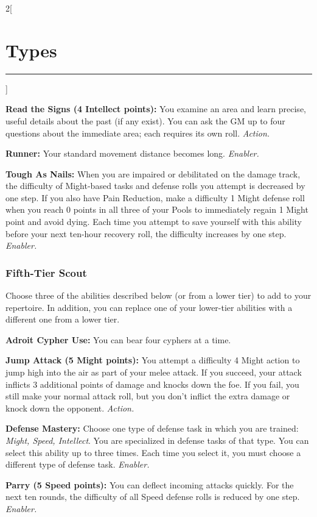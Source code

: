 \documentclass[a4paper,10pt,final]{book}
\newcommand{\HRule}{\rule{\linewidth}{0.5mm}} %
\newcommand{\newSection}[1]{\section*{#1} \addcontentsline{toc}{section}{#1} \label{sec:#1} \HRule}
\newcommand{\itemAbility}[2]{\textcolor{25gray}{\textbullet\textbf{ #1:}} {#2}\par}
\newcommand{\enabler}{\textit{ Enabler.}}
\newcommand{\action}{\textit{ Action.}}
\newenvironment{docsection}[1]
{
  \begin{multicols*}{2}[\newSection{#1}]
}
{
  \end{multicols*}
  \newpage
}
\begin{document}
\begin{docsection}{Types}
\itemAbility{Read the Signs (4 Intellect points)}{You examine an area and learn precise, useful details about the past (if any exist). You can ask the GM up to four questions about the immediate area; each requires its own roll.\action}

\itemAbility{Runner}{Your standard movement distance becomes long.\enabler}

\itemAbility{Tough As Nails}{When you are impaired or debilitated on the damage track, the difficulty of Might-based tasks and defense rolls you attempt is decreased by one step. If you also have Pain Reduction, make a difficulty 1 Might defense roll when you reach 0 points in all three of your Pools to immediately regain 1 Might point and avoid dying. Each time you attempt to save yourself with this ability before your next ten-hour recovery roll, the difficulty increases by one step.\enabler}


\subsubsection*{Fifth-Tier Scout}
\label{subsub:scoutFifthTier}

Choose three of the abilities described
below (or from a lower tier) to add to your
repertoire. In addition, you can replace one
of your lower-tier abilities with a different
one from a lower tier.

\itemAbility{Adroit Cypher Use}{You can bear four cyphers at a time.}

\itemAbility{Jump Attack (5 Might points)}{You attempt a difficulty 4 Might action to jump high into the air as part of your melee attack. If you succeed, your attack inflicts 3 additional points of damage and knocks down the foe. If you fail, you still make your normal attack roll, but you don’t inflict the extra damage or knock down the opponent.\action}

\itemAbility{Defense Mastery}{Choose one type of defense task in which you are trained: \textit{Might, Speed, Intellect}. You are specialized in defense tasks of that type. You can select this ability up to three times. Each time you select it, you must choose a different type of defense task.\enabler}

\itemAbility{Parry (5 Speed points)}{You can deflect incoming attacks quickly. For the next ten rounds, the difficulty of all Speed defense rolls is reduced by one step.\enabler}


\end{docsection}
\end{document}
